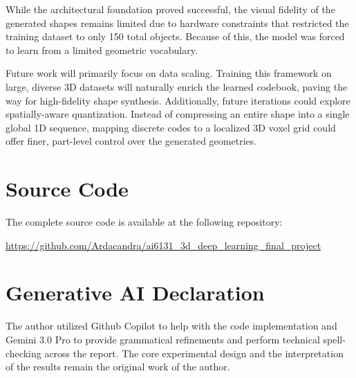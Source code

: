\documentclass[11pt, a4paper]{article}
\begin{document}
While the architectural foundation proved successful, the visual fidelity of the generated shapes remains limited due to hardware constraints that restricted the training dataset to only 150 total objects. Because of this, the model was forced to learn from a limited geometric vocabulary.

Future work will primarily focus on data scaling. Training this framework on large, diverse 3D datasets will naturally enrich the learned codebook, paving the way for high-fidelity shape synthesis. Additionally, future iterations could explore spatially-aware quantization. Instead of compressing an entire shape into a single global 1D sequence, mapping discrete codes to a localized 3D voxel grid could offer finer, part-level control over the generated geometries.

\section{Source Code}
The complete source code is available at the following repository:
\begin{center}
    \url{https://github.com/Ardacandra/ai6131_3d_deep_learning_final_project}
\end{center}

\section{Generative AI Declaration}

The author utilized Github Copilot \cite{githubcopilot} to help with the code implementation and Gemini 3.0 Pro \cite{gemini2026} to provide grammatical refinements and perform technical spell-checking across the report. The core experimental design and the interpretation of the results remain the original work of the author.


\end{document}
